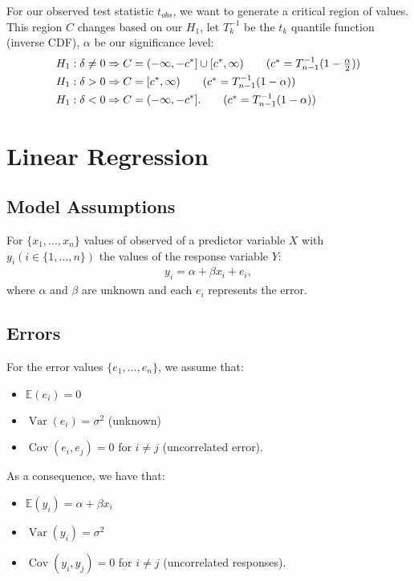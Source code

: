 \documentclass[a4paper, 12pt, twoside]{article}
\DeclareMathOperator{\Var}{Var}
\DeclareMathOperator{\Cov}{Cov}
\begin{document}
For our observed test statistic $t_{obs}$, we want to generate a
critical region of values. This region $C$ changes based on our
$H_1$, let $T^{-1}_k$ be the $t_k$ quantile function (inverse CDF),
$\alpha$ be our significance level:
\begin{align*}
    H_1 : \delta \neq 0 & \Rightarrow
    C = (-\infty, -c^*] \cup [c^*, \infty)
    \tag{$ c^* = T^{-1}_{n - 1}(1 - \frac{\alpha}{2}) $}         \\
    H_1 : \delta > 0    & \Rightarrow
    C = [c^*, \infty) \tag{$ c^* = T^{-1}_{n - 1}(1 - \alpha) $} \\
    H_1 : \delta < 0    & \Rightarrow C = (-\infty, -c^*].
    \tag{$ c^* = T^{-1}_{n - 1}(1 - \alpha) $}
\end{align*}

\newpage

\section{Linear Regression}

\subsection{Model Assumptions}

For $\{x_1, \ldots, x_n\}$ values of observed of a predictor
variable $X$ with $y_i (i \in \{1, \ldots, n\})$ the values
of the response variable $Y$:
\begin{align*}
    y_i = \alpha + \beta x_i + e_i,
\end{align*}
where $\alpha$ and $\beta$ are unknown and each $e_i$ represents the
error.

\subsection{Errors}

For the error values $\{e_1, \ldots, e_n\}$, we assume that:
\begin{itemize}
    \item $\mathbb{E}(e_i) = 0$
    \item $\Var(e_i) = \sigma^2$ (unknown)
    \item $\Cov(e_i, e_j) = 0$ for $i \neq j$ (uncorrelated error).
\end{itemize}
As a consequence, we have that:
\begin{itemize}
    \item $\mathbb{E}(y_i) = \alpha + \beta x_i$
    \item $\Var(y_i) = \sigma^2$
    \item $\Cov(y_i, y_j) = 0$ for $i \neq j$ (uncorrelated responses).
\end{itemize}
\end{document}
